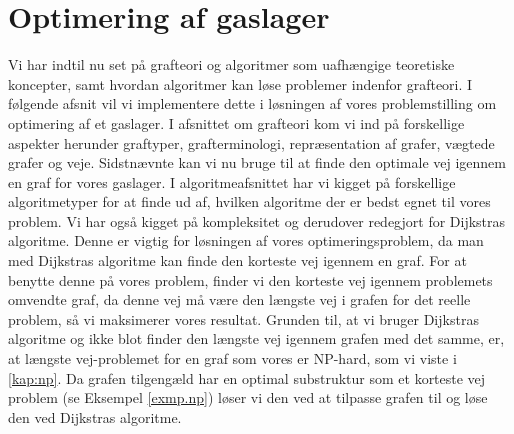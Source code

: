 \chapter{Optimering af gaslager}
Vi har indtil nu set på grafteori og algoritmer som  uafhængige teoretiske koncepter, samt hvordan algoritmer kan løse problemer indenfor grafteori. I følgende afsnit vil vi implementere dette i løsningen af vores problemstilling om optimering af et gaslager. I afsnittet om grafteori kom vi ind på forskellige aspekter herunder graftyper, grafterminologi, repræsentation af grafer, vægtede grafer og veje. Sidstnævnte kan vi nu bruge til at finde den optimale vej igennem en graf for vores gaslager. I algoritmeafsnittet har vi kigget på forskellige algoritmetyper for at finde ud af, hvilken algoritme der er bedst egnet til vores problem. Vi har også kigget på kompleksitet og derudover redegjort for Dijkstras algoritme. Denne er vigtig for løsningen af vores optimeringsproblem, da man med Dijkstras algoritme kan finde den korteste vej igennem en graf. For at benytte denne på vores problem, finder vi den korteste vej igennem problemets omvendte graf, da denne vej må være den længste vej i grafen for det reelle problem, så vi maksimerer vores resultat. Grunden til, at vi bruger Dijkstras algoritme og ikke blot finder den længste vej igennem grafen med det samme, er, at længste vej-problemet for en graf som vores er NP-hard, som vi viste i \autoref{kap:np}. Da grafen tilgengæld har en optimal substruktur som et korteste vej problem (se Eksempel \ref{exmp.np}) løser vi den ved at tilpasse grafen til og løse den ved Dijkstras algoritme.



















